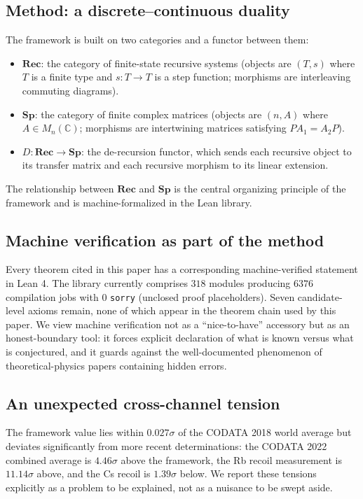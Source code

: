 \documentclass[11pt,twoside]{article}
\newcommand{\rec}{\mathbf{Rec}}
\newcommand{\spc}{\mathbf{Sp}}
\newcommand{\DF}{\ensuremath{D}}
\begin{document}
\subsection{Method: a discrete--continuous duality}
The framework is built on two categories and a functor between them:
\begin{itemize}
\item $\rec$: the category of finite-state recursive systems (objects are $(T, s)$ where $T$ is a finite type and $s : T \to T$ is a step function; morphisms are interleaving commuting diagrams).
\item $\spc$: the category of finite complex matrices (objects are $(n, A)$ where $A \in M_n(\mathbb{C})$; morphisms are intertwining matrices satisfying $PA_1 = A_2P$).
\item $\DF : \rec \to \spc$: the de-recursion functor, which sends each recursive object to its transfer matrix and each recursive morphism to its linear extension.
\end{itemize}

The relationship between $\rec$ and $\spc$ is the central organizing principle of the framework and is machine-formalized in the Lean library.

\subsection{Machine verification as part of the method}
Every theorem cited in this paper has a corresponding machine-verified statement in Lean 4. The library currently comprises $318$ modules producing $6376$ compilation jobs with $0$ \texttt{sorry} (unclosed proof placeholders). Seven candidate-level axioms remain, none of which appear in the theorem chain used by this paper. We view machine verification not as a ``nice-to-have'' accessory but as an honest-boundary tool: it forces explicit declaration of what is known versus what is conjectured, and it guards against the well-documented phenomenon of theoretical-physics papers containing hidden errors.

\subsection{An unexpected cross-channel tension}
The framework value lies within $0.027\sigma$ of the CODATA 2018 world average but deviates significantly from more recent determinations: the CODATA 2022 combined average is $4.46\sigma$ above the framework, the Rb recoil measurement is $11.14\sigma$ above, and the Cs recoil is $1.39\sigma$ below. We report these tensions explicitly as a problem to be explained, not as a nuisance to be swept aside.
\end{document}
